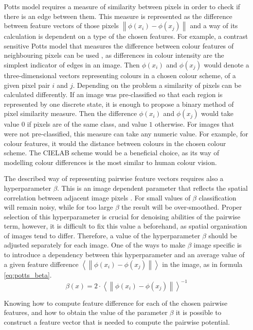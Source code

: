 Potts model requires a measure of similarity between pixels in order to check if there is an edge between them. This measure is represented as the difference between feature vectors of those pixels $\left \| \phi(x_i) - \phi(x_j)\right \|$ and a way of its calculation is dependent on a type of the chosen features. For example, a contrast sensitive Potts model that measures the difference between colour features of neighbouring pixels can be used \cite{article_main}, as differences in colour intensity are the simplest indicator of edges in an image. Then $\phi(x_i)$ and $\phi(x_j)$ would denote a three-dimensional vectors representing colours in a chosen colour scheme, of a given pixel pair $i$ and $j$. Depending on the problem a similarity of pixels can be calculated differently. If an image was pre-classified so that each region is represented by one discrete state, it is enough to propose a binary method of pixel similarity measure. Then the difference $\phi(x_i)$ and $\phi(x_j)$ would take value $0$ if pixels are of the same class, and value $1$ otherwise. For images that were not pre-classified, this measure can take any numeric value. For example, for colour features, it would the distance between colours in the chosen colour scheme. The CIELAB scheme would be a beneficial choice, as its way of modelling colour differences is the most similar to human colour vision. 

The described way of representing pairwise feature vectors requires also a hyperparameter $\beta$. This is an image dependent parameter that reflects the spatial correlation between adjacent image pixels \cite{potts_beta}. For small values of $\beta$ classification will remain noisy, while for too large $\beta$ the result will be over-smoothed. Proper selection of this hyperparameter is crucial for denoising abilities of the pairwise term, however, it is difficult to fix this value a beforehand, as spatial organisation of images tend to differ. Therefore, a value of the hyperparameter $\beta$ should be adjusted separately for each image. One of the ways to make $\beta$ image specific is to introduce a dependency between this hyperparameter and an average value of a given feature difference $\left \langle \left \| \phi(x_i) - \phi(x_j)\right \| \right \rangle$ in the image, as in formula \ref{eq:potts_beta}.
\begin{equation}
    \label{eq:potts_beta}
    \beta(x) = {2 \cdot {\left \langle \left \| \phi(x_i) - \phi(x_j)\right \| \right \rangle}} ^ {-1}
\end{equation}

Knowing how to compute feature difference for each of the chosen pairwise features, and how to obtain the value of the parameter $\beta$ it is possible to construct a feature vector that is needed to compute the pairwise potential. 